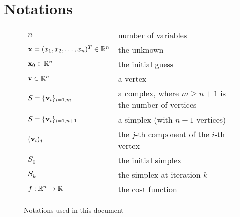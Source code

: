\chapter*{Notations}


\begin{figure}[h]
\begin{center}
\begin{tabular}{|l|l|}
\hline
$n$ & number of variables\\
$\mathbf{x}=(x_1,x_2,\ldots,x_n)^T \in\mathbb{R}^n$ & the unknown\\
$\mathbf{x}_0\in\mathbb{R}^n$ & the initial guess\\
$\mathbf{v}\in\mathbb{R}^n$ & a vertex\\
$S=\{\mathbf{v}_i\}_{i=1,m}$ & a complex, where $m\geq n+1$ is the number of vertices\\
$S=\{\mathbf{v}_i\}_{i=1,n+1}$ & a simplex (with $n+1$ vertices)\\
$(\mathbf{v}_i)_j$ & the $j$-th component of the $i$-th vertex\\
$S_0$& the initial simplex\\
$S_k$& the simplex at iteration $k$\\
$f:\mathbb{R}^n\rightarrow\mathbb{R}$& the cost function\\
\hline
\end{tabular}
\end{center}
\caption{Notations used in this document}
\label{fig-notations}
\end{figure}
